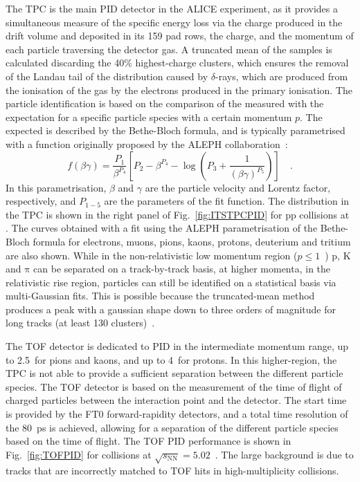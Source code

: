 The TPC is the main PID detector in the ALICE experiment, as it provides a simultaneous measure of the specific energy loss via the charge produced in the drift volume and deposited in its 159 pad rows, the charge, and the momentum of each particle traversing the detector gas. A truncated mean of the \dedx samples is calculated discarding the 40\% highest-charge clusters, which ensures the removal of the Landau tail of the \dedx distribution caused by $\delta$-rays, which are produced from the ionisation of the gas by the electrons produced in the primary ionisation. The particle identification is based on the comparison of the measured \dedx with the expectation for a specific particle species with a certain momentum $p$. The expected \dedx is described by the Bethe-Bloch formula, and is typically parametrised with a function originally proposed by the ALEPH collaboration~\cite{Blum:2008nqe}:
\begin{equation*}
    f(\beta\gamma) = \frac{P_1}{\beta^{P_4}}\left[P_2 - \beta^{P_4} - \log\left(P_3 + \frac{1}{(\beta\gamma)^{P_5}}\right)\right]\quad .
\end{equation*}
In this parametrisation, $\beta$ and $\gamma$ are the particle velocity and Lorentz factor, respectively, and $P_{1-5}$ are the parameters of the fit function. The \dedx distribution in the TPC is shown in the right panel of Fig.~\ref{fig:ITSTPCPID} for pp collisions at \thirteen. The curves obtained with a fit using the ALEPH parametrisation of the Bethe-Bloch formula for electrons, muons, pions, kaons, protons, deuterium and tritium are also shown. While in the non-relativistic low momentum region ($p \leq 1$~\gevc) p, K and $\mathrm{\pi}$ can be separated on a track-by-track basis, at higher momenta, in the relativistic rise region, particles can still be identified on a statistical basis via multi-Gaussian fits. This is possible because the truncated-mean method produces a \dedx peak with a gaussian shape down to three orders of magnitude for long tracks (at least 130 clusters)~\cite{ALICE:2014sbx}.

The TOF detector is dedicated to PID in the intermediate momentum range, up to 2.5~\gevc for pions and kaons, and up to 4~\gevc for protons. In this higher-\pt region, the TPC is not able to provide a sufficient separation between the different particle species. The TOF detector is based on the measurement of the time of flight of charged particles between the interaction point and the detector. The start time is provided by the FT0 forward-rapidity detectors, and a total time resolution of the 80~ps is achieved, allowing for a separation of the different particle species based on the time of flight. The TOF PID performance is shown in Fig.~\ref{fig:TOFPID} for \pbpb collisions at $\sqrt{s_\mathrm{NN}} = 5.02$~\tev. The large background is due to tracks that are incorrectly matched to TOF hits in high-multiplicity \pbpb collisions.


